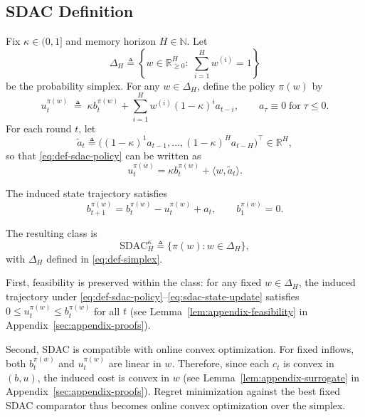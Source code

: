 \documentclass[11pt]{article}
\begin{document}
\subsection{SDAC Definition}
Fix $\kappa\in(0,1]$ and memory horizon $H\in\mathbb{N}$. Let
\begin{equation}
\label{eq:def-simplex}
\Delta_H \triangleq \left\{w\in\mathbb{R}_{\ge 0}^H:\; \sum_{i=1}^H w^{(i)}=1\right\}
\end{equation}
be the probability simplex. For any $w\in\Delta_H$, define the policy $\pi(w)$ by
\begin{equation}
\label{eq:def-sdac-policy}
u_t^{\pi(w)} \;\triangleq\; \kappa b_t^{\pi(w)} + \sum_{i=1}^{H} w^{(i)}(1-\kappa)^i a_{t-i},
\qquad a_\tau\equiv 0\;\text{for}\;\tau\le 0.
\end{equation}
For each round $t$, let
\[
\widetilde{a}_t \triangleq \big((1-\kappa)^1 a_{t-1},\ldots,(1-\kappa)^H a_{t-H}\big)^\top \in \mathbb{R}^H,
\]
so that \eqref{eq:def-sdac-policy} can be written as
\begin{equation}
\label{eq:def-sdac-policy-vector}
u_t^{\pi(w)} = \kappa b_t^{\pi(w)} + \langle w,\widetilde{a}_t\rangle.
\end{equation}

The induced state trajectory satisfies
\begin{equation}
\label{eq:sdac-state-update}
b_{t+1}^{\pi(w)} = b_t^{\pi(w)} - u_t^{\pi(w)} + a_t,
\qquad b_1^{\pi(w)}=0.
\end{equation}

The resulting class is
\[
\mathrm{SDAC}_H^{\kappa}\triangleq\{\pi(w):w\in\Delta_H\},
\]
with $\Delta_H$ defined in \eqref{eq:def-simplex}.

First, feasibility is preserved within the class: for any fixed $w\in\Delta_H$, the induced trajectory under \eqref{eq:def-sdac-policy}--\eqref{eq:sdac-state-update} satisfies $0\le u_t^{\pi(w)}\le b_t^{\pi(w)}$ for all $t$ (see Lemma~\ref{lem:appendix-feasibility} in Appendix~\ref{sec:appendix-proofs}).

Second, SDAC is compatible with online convex optimization. For fixed inflows, both $b_t^{\pi(w)}$ and $u_t^{\pi(w)}$ are linear in $w$. Therefore, since each $c_t$ is convex in $(b,u)$, the induced cost is convex in $w$ (see Lemma~\ref{lem:appendix-surrogate} in Appendix~\ref{sec:appendix-proofs}). Regret minimization against the best fixed SDAC comparator thus becomes online convex optimization over the simplex.
\end{document}
